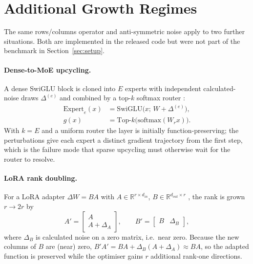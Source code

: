
\section{Additional Growth Regimes}
\label{app:regimes}
The same rows/columns operator and anti-symmetric noise apply to two further situations. Both are implemented in the released code but were not part of the benchmark in Section~\ref{sec:setup}.

\paragraph{Dense-to-MoE upcycling.}
A dense SwiGLU block is cloned into $E$ experts with independent calculated-noise draws $\Delta^{(e)}$ and combined by a top-$k$ softmax router \citep{shazeer2017outrageously,fedus2022switch}:
\begin{align}
    \mathrm{Expert}_e(x) &= \mathrm{SwiGLU}\big(x;\,W+\Delta^{(e)}\big), \\
    g(x) &= \mathrm{Top}\text{-}k\big(\mathrm{softmax}(W_r x)\big).
\end{align} With $k=E$ and a uniform router the layer is initially function-preserving; the perturbations give each expert a distinct gradient trajectory from the first step, which is the failure mode that sparse upcycling \citep{komatsuzaki2022sparse} must otherwise wait for the router to resolve.

\paragraph{LoRA rank doubling.}
For a LoRA adapter $\Delta W = BA$ with $A\in\mathbb{R}^{r\times d_{in}}$, $B\in\mathbb{R}^{d_{out}\times r}$ \citep{hu2021lora}, the rank is grown $r\to2r$ by
\begin{equation}
    A' = \begin{bmatrix} A \\ A+\Delta_A \end{bmatrix}, \qquad
    B' = \begin{bmatrix} B & \Delta_B \end{bmatrix},
\end{equation}
where $\Delta_B$ is calculated noise on a zero matrix, i.e.\ near zero. Because the new columns of $B$ are (near) zero, $B'A' = BA + \Delta_B(A+\Delta_A)\approx BA$, so the adapted function is preserved while the optimiser gains $r$ additional rank-one directions.

